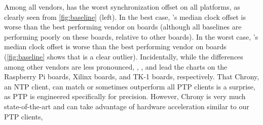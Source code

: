 Among all vendors,
 has the worst synchronization offset on
all platforms, as clearly seen from \cref{fig:baseline} (left).
In the best case,
's median clock offset is 
worse than the best performing vendor
on  boards
(although all baselines are performing poorly on these boards, relative to other boards).
In the worst case, 's median clock offset is
 worse
than the best performing vendor on  boards
(\cref{fig:baseline} shows that  is a clear outlier).
%
%
Incidentally, while the differences among other vendors are less pronounced,
,
, and
lead the charts on the Raspberry Pi boards, Xilinx boards, and TK-1 boards,
respectively.
%
%
That Chrony, an NTP client, can match or sometimes outperform all PTP clients
is a surprise, as PTP is engineered specifically for precision.
However, Chrony is very much state-of-the-art and can
take advantage of hardware acceleration similar to our PTP clients,

